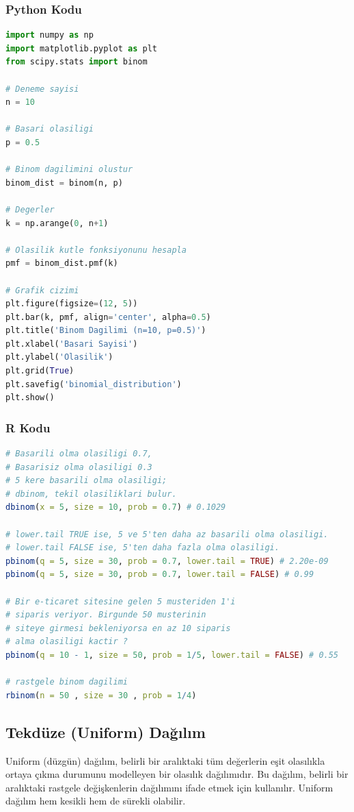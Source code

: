 \subsubsection{Python Kodu}

\begin{lstlisting}[language=Python]
import numpy as np
import matplotlib.pyplot as plt
from scipy.stats import binom

# Deneme sayisi
n = 10

# Basari olasiligi
p = 0.5

# Binom dagilimini olustur
binom_dist = binom(n, p)

# Degerler
k = np.arange(0, n+1)

# Olasilik kutle fonksiyonunu hesapla
pmf = binom_dist.pmf(k)

# Grafik cizimi
plt.figure(figsize=(12, 5))
plt.bar(k, pmf, align='center', alpha=0.5)
plt.title('Binom Dagilimi (n=10, p=0.5)')
plt.xlabel('Basari Sayisi')
plt.ylabel('Olasilik')
plt.grid(True)
plt.savefig('binomial_distribution')
plt.show()
\end{lstlisting}

\subsubsection{R Kodu}

\begin{lstlisting}[language=R]
# Basarili olma olasiligi 0.7,
# Basarisiz olma olasiligi 0.3
# 5 kere basarili olma olasiligi;
# dbinom, tekil olasiliklari bulur.
dbinom(x = 5, size = 10, prob = 0.7) # 0.1029

# lower.tail TRUE ise, 5 ve 5'ten daha az basarili olma olasiligi.
# lower.tail FALSE ise, 5'ten daha fazla olma olasiligi.
pbinom(q = 5, size = 30, prob = 0.7, lower.tail = TRUE) # 2.20e-09
pbinom(q = 5, size = 30, prob = 0.7, lower.tail = FALSE) # 0.99

# Bir e-ticaret sitesine gelen 5 musteriden 1'i
# siparis veriyor. Birgunde 50 musterinin
# siteye girmesi bekleniyorsa en az 10 siparis
# alma olasiligi kactir ?
pbinom(q = 10 - 1, size = 50, prob = 1/5, lower.tail = FALSE) # 0.55

# rastgele binom dagilimi
rbinom(n = 50 , size = 30 , prob = 1/4)
\end{lstlisting}

\newpage

\subsection{Tekdüze (Uniform) Dağılım}
Uniform (düzgün) dağılım, belirli bir aralıktaki tüm değerlerin eşit olasılıkla ortaya çıkma durumunu modelleyen bir olasılık dağılımıdır. Bu dağılım, belirli bir aralıktaki rastgele değişkenlerin dağılımını ifade etmek için kullanılır. Uniform dağılım hem kesikli hem de sürekli olabilir.


